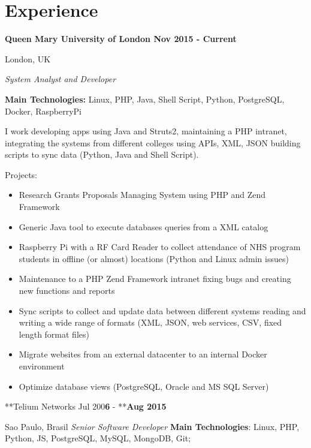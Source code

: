 \part{Experience}
\label{experience}

\textbf{Queen Mary University of London 							Nov 2015 - Current}

London, UK

\emph{System Analyst and Developer}

\textbf{Main Technologies:} Linux, PHP, Java, Shell Script, Python, PostgreSQL, Docker, RaspberryPi

I work developing apps using Java and Struts2, maintaining a PHP intranet, integrating the systems from different colleges using APIs, XML, JSON building scripts to sync data (Python, Java and Shell Script).

Projects:

\begin{itemize}
\item Research Grants Proposals Managing System using PHP and Zend Framework

\item Generic Java tool to execute databases queries from a XML catalog

\item Raspberry Pi with a RF Card Reader to collect attendance of NHS program students in offline (or almost) locations (Python and Linux admin issues)

\item Maintenance to a PHP Zend Framework intranet fixing bugs and creating new functions and reports

\item Sync scripts to collect and update data between different systems reading and writing a wide range of formats (XML, JSON, web services, CSV, fixed length format files)

\item Migrate websites from an external datacenter to an internal Docker environment

\item Optimize database views (PostgreSQL, Oracle and MS SQL Server)

\end{itemize}

**Telium Networks 									Jul 200\textbf{\textbf{6}} - **\textbf{Aug 2015}

Sao Paulo, Brasil
\emph{Senior Software Developer}
\textbf{Main Technologies}: Linux, PHP, Python, JS, PostgreSQL, MySQL, MongoDB, Git;

